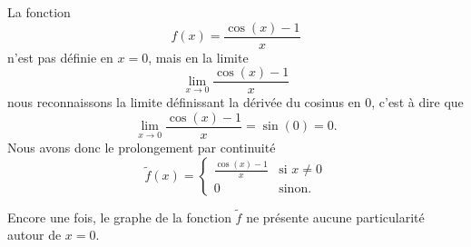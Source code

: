 \begin{example} \label{ExQWHooGddTLE}
    La fonction 
    \begin{equation}
        f(x)=\frac{ \cos(x)-1 }{ x }
    \end{equation}
    n'est pas définie en \( x=0\), mais en la limite
    \begin{equation}
        \lim_{x\to 0} \frac{ \cos(x)-1 }{ x }
    \end{equation}
    nous reconnaissons la limite définissant la dérivée du cosinus en \( 0\), c'est à dire que
    \begin{equation}
        \lim_{x\to 0} \frac{ \cos(x)-1 }{ x }=\sin(0)=0.
    \end{equation}
    Nous avons donc le prolongement par continuité
    \begin{equation}
        \tilde f(x)=\begin{cases}
            \frac{ \cos(x)-1 }{ x }    &   \text{si } x\neq 0\\
            0    &    \text{sinon}.
        \end{cases}
    \end{equation}

    Encore une fois, le graphe de la fonction \(\tilde f\) ne présente aucune particularité autour de \( x=0\).
    \begin{center}
        
    \end{center}
\end{example}

